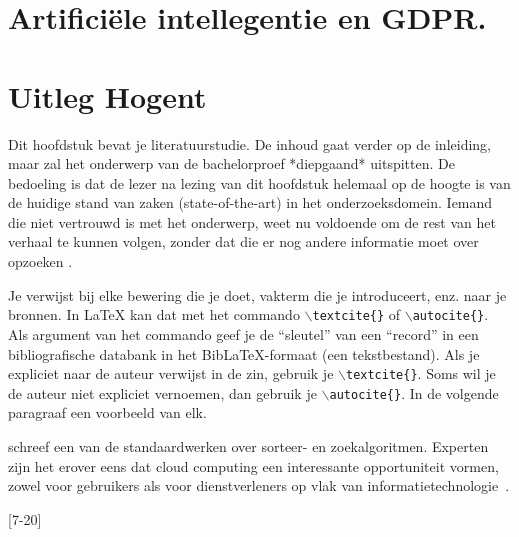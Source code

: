 \section{Artificiële intellegentie en GDPR.}

\section{{Uitleg Hogent}}
Dit hoofdstuk bevat je literatuurstudie. De inhoud gaat verder op de inleiding, maar zal het onderwerp van de bachelorproef *diepgaand* uitspitten. De bedoeling is dat de lezer na lezing van dit hoofdstuk helemaal op de hoogte is van de huidige stand van zaken (state-of-the-art) in het onderzoeksdomein. Iemand die niet vertrouwd is met het onderwerp, weet nu voldoende om de rest van het verhaal te kunnen volgen, zonder dat die er nog andere informatie moet over opzoeken \autocite{Pollefliet2011}.

Je verwijst bij elke bewering die je doet, vakterm die je introduceert, enz. naar je bronnen. In \LaTeX{} kan dat met het commando \texttt{$\backslash${textcite\{\}}} of \texttt{$\backslash${autocite\{\}}}. Als argument van het commando geef je de ``sleutel'' van een ``record'' in een bibliografische databank in het Bib\LaTeX{}-formaat (een tekstbestand). Als je expliciet naar de auteur verwijst in de zin, gebruik je \texttt{$\backslash${}textcite\{\}}.
Soms wil je de auteur niet expliciet vernoemen, dan gebruik je \texttt{$\backslash${}autocite\{\}}. In de volgende paragraaf een voorbeeld van elk.
\textcite{Lusignan2014} \textcite{ronnie}

\textcite{Knuth1998} schreef een van de standaardwerken over sorteer- en zoekalgoritmen. Experten zijn het erover eens dat cloud computing een interessante opportuniteit vormen, zowel voor gebruikers als voor dienstverleners op vlak van informatietechnologie~\autocite{Creeger2009}.

[7-20]
